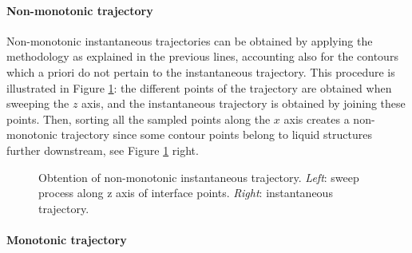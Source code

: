 \paragraph*{{Non-monotonic trajectory}} 

Non-monotonic instantaneous trajectories can be obtained by applying the methodology as explained in the previous lines, accounting also for the contours which a priori do not pertain to the instantaneous trajectory. This procedure is illustrated in Figure \ref{fig:trajectory_obtention_instantaneous_method_a}: the different points of the trajectory are obtained when sweeping the $z$ axis, and the instantaneous trajectory is obtained by joining these points. Then, sorting all the sampled points along the $x$ axis creates a non-monotonic trajectory since some contour points belong to liquid structures further downstream, see Figure \ref{fig:trajectory_obtention_instantaneous_method_a} right.

\begin{figure}[ht]
     \centering
     \begin{subfigure}[b]{0.45\textwidth}
         \centering
     \end{subfigure}
     \begin{subfigure}[b]{0.45\textwidth}
         \centering
     \end{subfigure}
        \caption[Obtention of non-monotonic instantaneous trajectory]{Obtention of non-monotonic instantaneous trajectory. \textsl{Left}: sweep process along z axis of interface points. \textsl{Right}: instantaneous trajectory.}
        \label{fig:trajectory_obtention_instantaneous_method_a}
\end{figure}


\paragraph*{Monotonic trajectory} 

